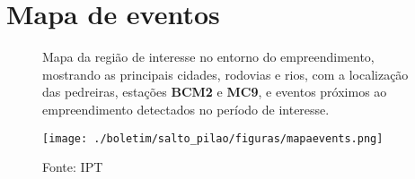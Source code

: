 
    \newpage
    \section{Mapa de eventos}
    \begin{figure}[ht!]
    \centering
    \captionsetup{justification=justified, singlelinecheck=false, width=1\textwidth}
    \caption{Mapa da região de interesse no entorno do empreendimento, mostrando as principais cidades, rodovias e rios, com a localização das pedreiras, estações \textbf{BCM2} e \textbf{MC9}, e eventos próximos ao empreendimento detectados no período de interesse.}
    \begin{mdframed}[
        linecolor=black,
        linewidth=1pt,
        roundcorner=10pt,
    ]
    \begin{center}
    \texttt{[image: ./boletim/salto\_pilao/figuras/mapaevents.png]}
    \end{center}
    \end{mdframed}
    \caption*{Fonte: IPT}
    \end{figure}
    \newpage
    